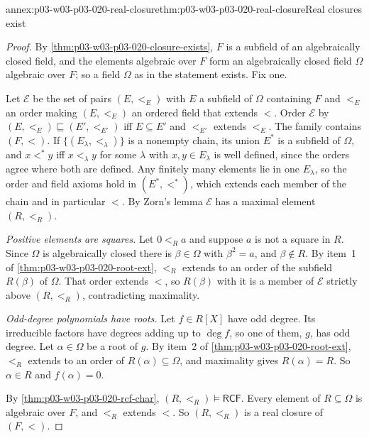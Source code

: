 \begin{annexitem}{annex:p03-w03-p03-020-real-closure}{thm:p03-w03-p03-020-real-closure}{Real closures exist}
\begin{proof}
By \cref{thm:p03-w03-p03-020-closure-exists}, \(F\) is a subfield of an
algebraically closed field, and the elements algebraic over \(F\) form an
algebraically closed field \(\Omega\) algebraic over \(F\); so a field
\(\Omega\) as in the statement exists. Fix one.

Let \(\mathcal E\) be the set of pairs \((E,<_E)\) with \(E\) a subfield of
\(\Omega\) containing \(F\) and \(<_E\) an order making \((E,<_E)\) an
ordered field that extends \(<\). Order \(\mathcal E\) by
\((E,<_E)\sqsubseteq(E',<_{E'})\) iff \(E\subseteq E'\) and \(<_{E'}\)
extends \(<_E\). The family contains \((F,<)\). If
\(\{(E_\lambda,<_\lambda)\}\) is a nonempty chain, its union \(E^*\) is a
subfield of \(\Omega\), and \(x<^*y\) iff \(x<_\lambda y\) for some
\(\lambda\) with \(x,y\in E_\lambda\) is well defined, since the orders agree
where both are defined. Any finitely many elements lie in one
\(E_\lambda\), so the order and field axioms hold in \((E^*,<^*)\), which
extends each member of the chain and in particular \(<\). By Zorn's lemma
\(\mathcal E\) has a maximal element \((R,<_R)\).

\emph{Positive elements are squares.} Let \(0<_Ra\) and suppose \(a\) is not
a square in \(R\). Since \(\Omega\) is algebraically closed there is
\(\beta\in\Omega\) with \(\beta^2=a\), and \(\beta\notin R\). By item~1 of
\cref{thm:p03-w03-p03-020-root-ext}, \(<_R\) extends to an order of
the subfield \(R(\beta)\) of \(\Omega\). That order extends \(<\), so
\(R(\beta)\) with it is a member of \(\mathcal E\) strictly above
\((R,<_R)\), contradicting maximality.

\emph{Odd-degree polynomials have roots.} Let \(f\in R[X]\) have odd degree.
Its irreducible factors have degrees adding up to \(\deg f\), so one of
them, \(g\), has odd degree. Let \(\alpha\in\Omega\) be a root of \(g\). By
item~2 of \cref{thm:p03-w03-p03-020-root-ext}, \(<_R\) extends to
an order of \(R(\alpha)\subseteq\Omega\), and maximality gives
\(R(\alpha)=R\). So \(\alpha\in R\) and \(f(\alpha)=0\).

By \cref{thm:p03-w03-p03-020-rcf-char},
\((R,<_R)\models\mathsf{RCF}\). Every element of \(R\subseteq\Omega\) is
algebraic over \(F\), and \(<_R\) extends \(<\). So \((R,<_R)\) is a real
closure of \((F,<)\).
\end{proof}
\end{annexitem}

